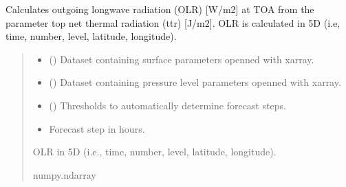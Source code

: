 \documentclass[a4paper,11pt,english]{sphinxmanual}
\begin{document}

\begin{fulllineitems}
\label{\detokenize{modules:climaccf.processing_surf_vars.get_olr_5d}}
\pysigstartsignatures
{}
\pysigstopsignatures
\sphinxAtStartPar
Calculates outgoing longwave radiation (OLR) {[}W/m2{]} at TOA from the parameter top net thermal radiation (ttr)
{[}J/m2{]}. OLR is calculated in 5D (i.e, time, number, level, latitude, longitude).
\begin{quote}\begin{description}
\begin{itemize}
\item {} 
\sphinxAtStartPar
{} () \textendash{} Dataset containing surface parameters openned with xarray.

\item {} 
\sphinxAtStartPar
{} () \textendash{} Dataset containing pressure level parameters openned with xarray.

\item {} 
\sphinxAtStartPar
{} () \textendash{} Thresholds to automatically determine forecast steps.

\item {} 
\sphinxAtStartPar
{} \textendash{} Forecast step in hours.

\end{itemize}

\sphinxAtStartPar
OLR in 5D (i.e., time, number, level, latitude, longitude).

\sphinxAtStartPar
numpy.ndarray

\end{description}\end{quote}

\end{fulllineitems}
\end{document}
